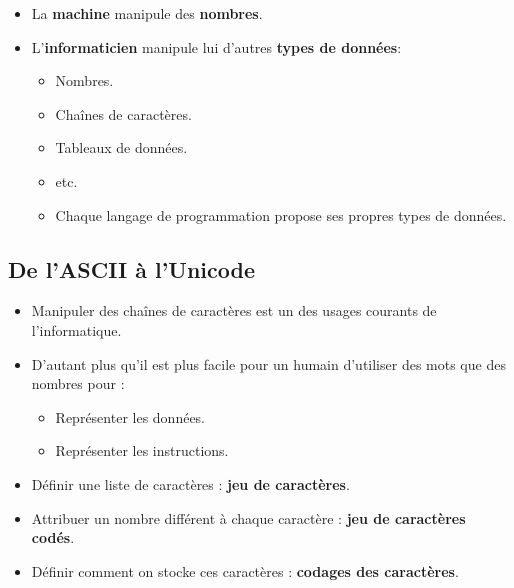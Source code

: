 \begin{slide}
	\begin{itemize}
		\item La \textbf{machine} manipule des \textbf{nombres}.
		\item L'\textbf{informaticien} manipule lui d'autres \textbf{types de données}:
		\begin{itemize}
			\item Nombres.
			\item Chaînes de caractères.
			\item Tableaux de données.
			\item etc. 
			\item Chaque langage de programmation propose ses propres types de données.
		\end{itemize}
	\end{itemize}
\end{slide}

\subsection{De l'ASCII à l'Unicode}
\begin{slide}
	\begin{itemize}
		\item Manipuler des chaînes de caractères est un des usages courants de l'informatique.
		\item D'autant plus qu'il est plus facile pour un humain d'utiliser des mots que des nombres pour :
			\begin{itemize}
				\item Représenter les données.
				\item Représenter les instructions.
			\end{itemize}
	\end{itemize}
\end{slide}
\begin{slide}
	\begin{itemize}
		\item Définir une liste de caractères : \textbf{jeu de caractères}.
		\item Attribuer un nombre différent à chaque caractère : \textbf{jeu de caractères codés}.
		\item Définir comment on stocke ces caractères : \textbf{codages des caractères}.
	\end{itemize}
\end{slide}

